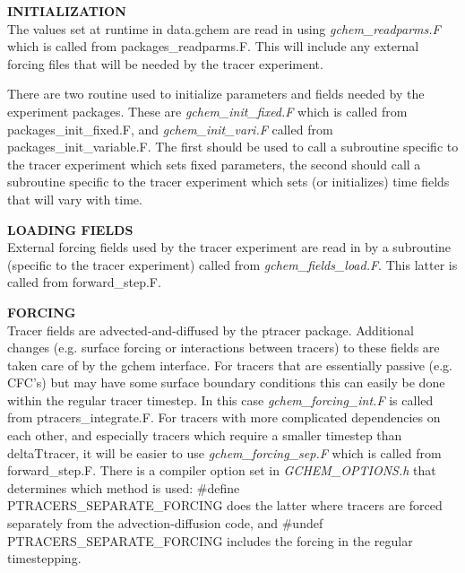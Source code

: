 \vspace{.5cm}

\noindent
{{\bf INITIALIZATION}}\\
The values set at runtime in data.gchem are read in
using {\it gchem\_readparms.F} which is called from
packages\_readparms.F. This will include any external
forcing files that will be needed by the tracer experiment.

There are two routine used to initialize parameters and fields
needed by the experiment packages. These are
{\it gchem\_init\_fixed.F} which is called from packages\_init\_fixed.F, and
{\it gchem\_init\_vari.F} called from 
packages\_init\_variable.F. The first should
be used to call a subroutine specific to the tracer experiment
which sets fixed parameters, the second should call a subroutine
specific to the tracer experiment
which sets (or initializes) time fields that will vary with time.

\vspace{.5cm}


\noindent
{{\bf LOADING FIELDS}}\\
External forcing fields used by the tracer experiment are read
in by a subroutine (specific to the tracer experiment) called from
{\it gchem\_fields\_load.F}. This latter is called from forward\_step.F.

\vspace{.5cm}


\noindent
{{\bf FORCING}}\\
Tracer fields are advected-and-diffused by the ptracer package.
Additional changes (e.g. surface forcing or interactions
between tracers) to these fields are taken care of by the gchem
interface. For tracers that are essentially passive (e.g. CFC's)
but may have some surface boundary conditions
this can easily be done within the regular tracer timestep. In this case
{\it gchem\_forcing\_int.F} is called from ptracers\_integrate.F.
For tracers with more complicated dependencies on each other,
and especially tracers which require a smaller timestep than
deltaTtracer, it will be easier to use {\it gchem\_forcing\_sep.F}
which is called from forward\_step.F. There is a 
compiler option set in {\it GCHEM\_OPTIONS.h} that determines
which method is used: \#define PTRACERS\_SEPARATE\_FORCING
does the latter where tracers are forced separately from the
advection-diffusion code, and \#undef PTRACERS\_SEPARATE\_FORCING
includes the forcing in the regular timestepping.

\vspace{.5cm}

